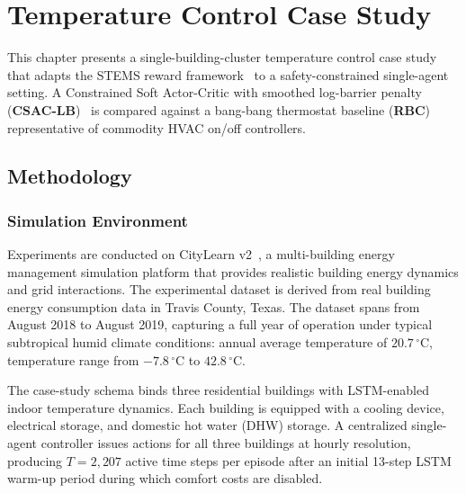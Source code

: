 
\chapter{Temperature Control Case Study}
\label{ch:temperature-case-study}

This chapter presents a single-building-cluster temperature control case study
that adapts the STEMS reward framework~\cite{zhang2025stems} to a
safety-constrained single-agent setting.  A Constrained Soft Actor-Critic with
smoothed log-barrier penalty (\textbf{CSAC-LB})~\cite{zhang2024csaclb} is
compared against a bang-bang thermostat baseline (\textbf{RBC}) representative
of commodity HVAC on/off controllers.

\section{Methodology}
\label{sec:temp-methodology}

\subsection{Simulation Environment}
\label{sec:temp-env}

Experiments are conducted on CityLearn v2~\cite{nweye2023citylearn}, a
multi-building energy management simulation platform that provides realistic
building energy dynamics and grid interactions.  The experimental dataset is
derived from real building energy consumption data in Travis County, Texas.  The
dataset spans from August 2018 to August 2019, capturing a full year of
operation under typical subtropical humid climate conditions: annual average
temperature of $20.7\,^\circ$C, temperature range from $-7.8\,^\circ$C to
$42.8\,^\circ$C.

The case-study schema binds three residential buildings with LSTM-enabled indoor
temperature dynamics.  Each building is equipped with a cooling device,
electrical storage, and domestic hot water (DHW) storage.  A centralized
single-agent controller issues actions for all three buildings at hourly
resolution, producing $T = 2{,}207$ active time steps per episode after an
initial 13-step LSTM warm-up period during which comfort costs are disabled.

